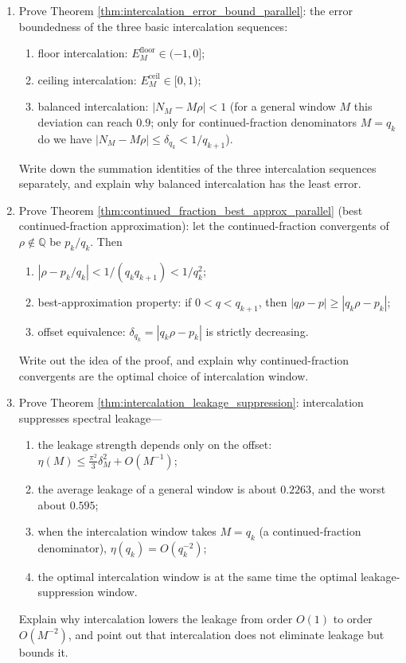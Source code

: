 \begin{enumerate}[leftmargin=3em, label=\textbf{Exercise \arabic*}]
    \item Prove Theorem \ref{thm:intercalation_error_bound_parallel}:
    the error boundedness of the three basic intercalation sequences:
    \begin{enumerate}[label=(\roman*)]
        \item floor intercalation: $E_M^{\mathrm{floor}}\in(-1,0]$;
        \item ceiling intercalation: $E_M^{\mathrm{ceil}}\in[0,1)$;
        \item balanced intercalation: $\big|N_M-M\rho\big|<1$ (for a general window $M$ this deviation can reach $0.9$; only for continued-fraction denominators $M=q_k$ do we have $\big|N_M-M\rho\big|\le\delta_{q_k}<1/q_{k+1}$).
    \end{enumerate}
    Write down the summation identities of the three intercalation sequences separately, and explain why balanced intercalation has the least error.

    \item Prove Theorem \ref{thm:continued_fraction_best_approx_parallel} (best continued-fraction approximation):
    let the continued-fraction convergents of $\rho\notin\mathbb{Q}$ be $p_k/q_k$. Then
    \begin{enumerate}[label=(\roman*)]
        \item $|\rho-p_k/q_k|<1/(q_kq_{k+1})<1/q_k^2$;
        \item best-approximation property: if $0<q<q_{k+1}$, then $|q\rho-p|\ge|q_k\rho-p_k|$;
        \item offset equivalence: $\delta_{q_k}=|q_k\rho-p_k|$ is strictly decreasing.
    \end{enumerate}
    Write out the idea of the proof, and explain why continued-fraction convergents are the optimal choice of intercalation window.

    \item Prove Theorem \ref{thm:intercalation_leakage_suppression}:
    intercalation suppresses spectral leakage---
    \begin{enumerate}[label=(\roman*)]
        \item the leakage strength depends only on the offset: $\eta(M)\le\frac{\pi^2}{3}\delta_M^2+O(M^{-1})$;
        \item the average leakage of a general window is about $0.2263$, and the worst about $0.595$;
        \item when the intercalation window takes $M=q_k$ (a continued-fraction denominator),
              $\eta(q_k)=O(q_k^{-2})$;
        \item the optimal intercalation window is at the same time the optimal leakage-suppression window.
    \end{enumerate}
    Explain why intercalation lowers the leakage from order $O(1)$ to order $O(M^{-2})$,
    and point out that intercalation does not eliminate leakage but bounds it.


\end{enumerate}
